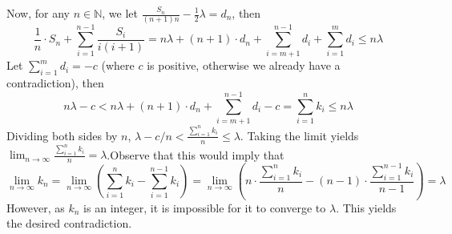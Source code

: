 \begin{enumerate}
 Now, for any $n\in\mathbb{N}$, we let $\frac{S_n}{(n+1)n}-\frac{1}{2}\lambda=d_n$, then
 \[\frac{1}{n}\cdot S_n+\sum_{i=1}^{n-1}\frac{S_i}{i(i+1)} =n\lambda+(n+1)\cdot d_n+\sum_{i=m+1}^{n-1}d_i+\sum_{i=1}^{m}d_i \leq n\lambda\]Let $\sum_{i=1}^{m}d_i=-c$ (where $c$ is positive, otherwise we already have a contradiction), then 
 \[n\lambda-c< n\lambda+(n+1)\cdot d_n+\sum_{i=m+1}^{n-1}d_i-c =\sum_{i=1}^{n}k_i\leq n\lambda\]Dividing both sides by $n$, $\lambda-c/n<\frac{\sum_{i=1}^{n}k_i}{n}\leq \lambda$. Taking the limit yields$\lim_{n\to\infty}{\frac{\sum_{i=1}^{n}k_i}{n}}=\lambda$.Observe that this would imply that
 \[\lim_{n\to\infty}{k_n} =\lim_{n\to\infty}{\left(\sum_{i=1}^{n}k_i-\sum_{i=1}^{n-1}k_i\right)} =\lim_{n\to\infty}{\left(n\cdot\frac{\sum_{i=1}^{n}k_i}{n}-(n-1)\cdot\frac{\sum_{i=1}^{n-1}k_i}{n-1}\right)} =\lambda\]However, as $k_n$ is an integer, it is impossible for it to converge to $\lambda$. This yields the desired contradiction.

 


\end{enumerate}